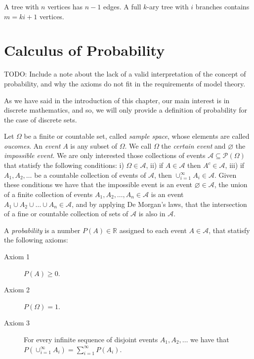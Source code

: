 \begin{example}
A tree with $n$ vertices has $n-1$ edges. A full $k$-ary tree with $i$ branches contains $m=ki+1$ vertices.
\end{example}

%
%

\section{Calculus of Probability}
\label{sec:probability}

{\color{red} TODO: Include a note about the lack of a valid interpretation of the concept of probability, and why the axioms do not fit in the requirements of model theory.}

As we have said in the introduction of this chapter, our main interest is in discrete mathematics, and so, we will only provide a definition of probability for the case of discrete sets.

Let $\Omega$ be a finite or countable set, called \emph{sample space}, whose elements are called \emph{oucomes}. An \emph{event} $A$ is any subset of $\Omega$. We call $\Omega$ the \emph{certain event} and $\varnothing$ the \emph{impossible event}. We are only interested those collections of events $\mathcal{A} \subseteq \mathcal{P}\left( \Omega \right)$ that statisfy the following conditions: i) $\Omega \in \mathcal{A}$, ii) if $A \in \mathcal{A}$ then $A^c \in \mathcal{A}$, iii) if $A_1, A_2, \ldots$ be a countable collection of events of $\mathcal{A}$, then $\cup_{i=1}^\infty A_i \in \mathcal{A}$. Given these conditions we have that the impossible event is an event $\varnothing \in \mathcal{A}$, the union of a finite collection of events $A_1, A_2, \ldots, A_n \in \mathcal{A}$ is an event $A_1 \cup A_2 \cup \ldots \cup A_n \in \mathcal{A}$, and by applying De Morgan's laws, that the intersection of a fine or countable collection of sets of $\mathcal{A}$ is also in $\mathcal{A}$.

A \emph{probability} is a number $P(A) \in \mathbb{R}$ assigned to each event $A \in \mathcal{A}$, that statisfy the following axioms:

\begin{description}

\item [Axiom 1] $P(A) \geq 0$.

\item [Axiom 2] $P(\Omega) = 1$.

\item [Axiom 3] For every infinite sequence of disjoint events $A_1, A_2, \ldots$ we have that $P(\cup_{i=1}^\infty A_i) = \sum_{i=1}^\infty P(A_i)$.

\end{description}

